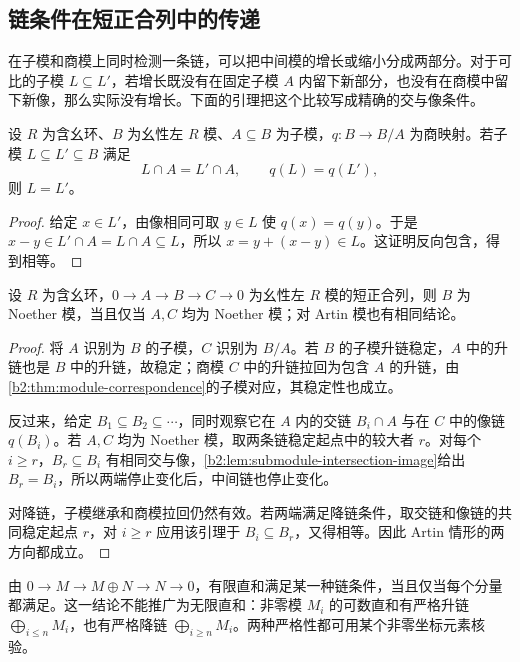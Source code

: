 \subsection{链条件在短正合列中的传递}
\label{b2:subsec:1201:02}

在子模和商模上同时检测一条链，可以把中间模的增长或缩小分成两部分。对于可比的子模 \(L\subseteq L'\)，若增长既没有在固定子模 \(A\) 内留下新部分，也没有在商模中留下新像，那么实际没有增长。下面的引理把这个比较写成精确的交与像条件。

\begin{lemma}\label{b2:lem:submodule-intersection-image}
	设 \(R\) 为含幺环、\(B\) 为幺性左 \(R\) 模、\(A\subseteq B\) 为子模，\(q:B\rightarrow B/A\) 为商映射。若子模 \(L\subseteq L'\subseteq B\) 满足
	\[
		L\cap A=L'\cap A,\qquad q(L)=q(L'),
	\]
	则 \(L=L'\)。
\end{lemma}
\begin{proof}
	给定 \(x\in L'\)，由像相同可取 \(y\in L\) 使 \(q(x)=q(y)\)。于是 \(x-y\in L'\cap A=L\cap A\subseteq L\)，所以 \(x=y+(x-y)\in L\)。这证明反向包含，得到相等。
\end{proof}

\begin{theorem}\label{b2:thm:chain-conditions-exact}
	设 \(R\) 为含幺环，\(0\rightarrow A\rightarrow B\rightarrow C\rightarrow0\) 为幺性左 \(R\) 模的短正合列，则 \(B\) 为 Noether 模，当且仅当 \(A,C\) 均为 Noether 模；对 Artin 模也有相同结论。
\end{theorem}
\begin{proof}
	将 \(A\) 识别为 \(B\) 的子模，\(C\) 识别为 \(B/A\)。若 \(B\) 的子模升链稳定，\(A\) 中的升链也是 \(B\) 中的升链，故稳定；商模 \(C\) 中的升链拉回为包含 \(A\) 的升链，由\cref{b2:thm:module-correspondence}的子模对应，其稳定性也成立。

	反过来，给定 \(B_1\subseteq B_2\subseteq\cdots\)，同时观察它在 \(A\) 内的交链 \(B_i\cap A\) 与在 \(C\) 中的像链 \(q(B_i)\)。若 \(A,C\) 均为 Noether 模，取两条链稳定起点中的较大者 \(r\)。对每个 \(i\ge r\)，\(B_r\subseteq B_i\) 有相同交与像，\cref{b2:lem:submodule-intersection-image}给出 \(B_r=B_i\)，所以两端停止变化后，中间链也停止变化。

	对降链，子模继承和商模拉回仍然有效。若两端满足降链条件，取交链和像链的共同稳定起点 \(r\)，对 \(i\ge r\) 应用该引理于 \(B_i\subseteq B_r\)，又得相等。因此 Artin 情形的两方向都成立。
\end{proof}

由 \(0\rightarrow M\rightarrow M\oplus N\rightarrow N\rightarrow0\)，有限直和满足某一种链条件，当且仅当每个分量都满足。这一结论不能推广为无限直和：非零模 \(M_i\) 的可数直和有严格升链 \(\bigoplus_{i\le n}M_i\)，也有严格降链 \(\bigoplus_{i\ge n}M_i\)。两种严格性都可用某个非零坐标元素核验。

